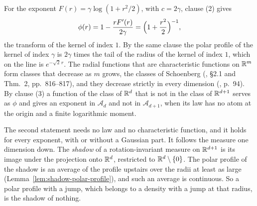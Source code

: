 For the \Matern{} exponent $F(r) = \gamma\log(1 + r^2/2)$, with $c = 2\gamma$, clause (2) gives
\[
  \phi(r) = 1 - \frac{rF'(r)}{2\gamma} = \Bigl(1 + \frac{r^2}{2}\Bigr)^{-1} ,
\]
the transform of the \Matern{} kernel of index $1$. By the same clause the polar profile of the
\Matern{} kernel
of index $\gamma$ is $2\gamma$ times the tail of the radius of the \Matern{} kernel of index $1$,
which on the line is $e^{-\sqrt2\,r}$. The radial functions that are
characteristic functions on $\mathbb{R}^m$ form classes that decrease as $m$ grows, the classes of
Schoenberg (, \S2.1 and Thm.~2, pp.~816--817), and they decrease
strictly in
every dimension (, p.~94). By
clause (3) a function of the class of $\mathbb{R}^d$ that is not in the class of $\mathbb{R}^{d+1}$ serves as
$\phi$ and gives an exponent in $\mathcal{A}_d$ and not in $\mathcal{A}_{d+1}$, when its law has
no atom at the origin and a finite logarithmic moment.

The second statement needs no law and no characteristic function, and it holds for every
exponent, with or without a Gaussian part. It follows the \Levy{} measure one dimension down.
The \emph{shadow} of a rotation-invariant \Levy{} measure on $\mathbb{R}^{d+1}$ is its image under the
projection onto $\mathbb{R}^d$, restricted to $\mathbb{R}^d \setminus \{0\}$. The polar profile of the shadow
is an average of the profile
upstairs over the radii at least as large (Lemma~\ref{lem:shadow-polar-profile}), and such an
average is continuous. So a polar profile with a jump, which belongs to a \Levy{} density with
a jump at that radius, is the shadow of nothing.

